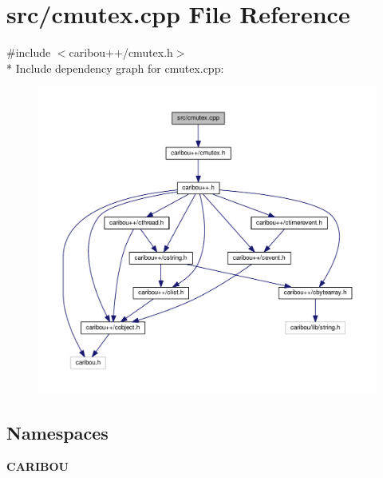 \section{src/cmutex.cpp File Reference}
\label{cmutex_8cpp}
{\ttfamily \#include $<$caribou++/cmutex.\-h$>$}\\*
Include dependency graph for cmutex.\-cpp\-:\nopagebreak
\begin{figure}[H]
\begin{center}
\leavevmode
\includegraphics[width=350pt]{cmutex_8cpp__incl}
\end{center}
\end{figure}
\subsection*{Namespaces}
\begin{DoxyCompactItemize}
\item 
{\bf C\-A\-R\-I\-B\-O\-U}
\end{DoxyCompactItemize}
